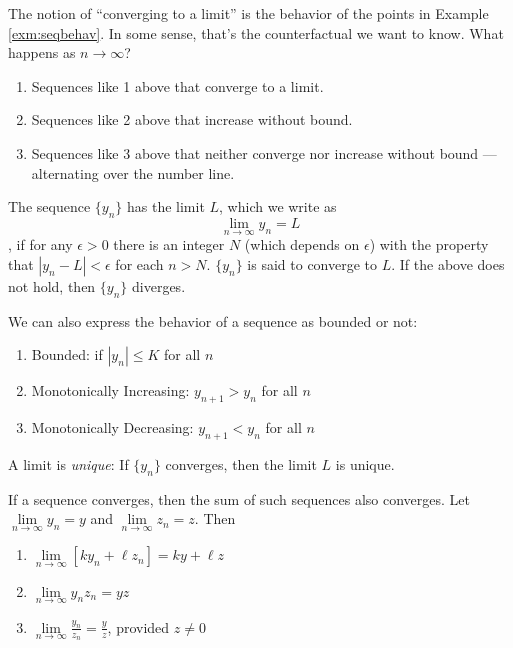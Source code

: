 \documentclass[]{book}
\providecommand{\tightlist}{%
  \setlength{\itemsep}{0pt}\setlength{\parskip}{0pt}}
\theoremstyle{definition}
\theoremstyle{definition}
\theoremstyle{definition}
\theoremstyle{remark}
\let\BeginKnitrBlock\begin \let\EndKnitrBlock\end
\begin{document}
The notion of ``converging to a limit'' is the behavior of the points in Example \ref{exm:seqbehav}. In some sense, that's the counterfactual we want to know. What happens as \(n\rightarrow \infty\)?

\begin{enumerate}
\def\labelenumi{\arabic{enumi}.}
\tightlist
\item
  Sequences like 1 above that converge to a limit.
\item
  Sequences like 2 above that increase without bound.
\item
  Sequences like 3 above that neither converge nor increase without bound --- alternating over the number line.
\end{enumerate}

\BeginKnitrBlock{definition}
\protect\hypertarget{def:unnamed-chunk-2}{}{\label{def:unnamed-chunk-2} }The sequence \(\{y_n\}\) has the limit \(L\), which we write as \[\lim\limits_{n \to \infty} y_n =L\], if for any \(\epsilon>0\) there is an integer \(N\) (which depends on \(\epsilon\)) with the property that \(|y_n -L|<\epsilon\) for each \(n>N\). \(\{y_n\}\) is said to converge to \(L\). If the above does not hold, then \(\{y_n\}\) diverges.
\EndKnitrBlock{definition}

We can also express the behavior of a sequence as bounded or not:

\begin{enumerate}
\def\labelenumi{\arabic{enumi}.}
\tightlist
\item
  Bounded: if \(|y_n|\le K\) for all \(n\)
\item
  Monotonically Increasing: \(y_{n+1}>y_n\) for all \(n\)
\item
  Monotonically Decreasing: \(y_{n+1}<y_n\) for all \(n\)
\end{enumerate}

A limit is \emph{unique}: If \(\{y_n\}\) converges, then the limit \(L\) is unique.

If a sequence converges, then the sum of such sequences also converges. Let \(\lim\limits_{n \to \infty} y_n = y\) and \(\lim\limits_{n \to \infty} z_n =z\). Then

\begin{enumerate}
\def\labelenumi{\arabic{enumi}.}
\tightlist
\item
  \(\lim\limits_{n \to \infty} [k y_n + \ell z_n]= k y + \ell z\)
\item
  \(\lim\limits_{n \to \infty} y_n z_n = yz\)
\item
  \(\lim\limits_{n \to \infty} \frac{y_n}{z_n} = \frac{y}{z}\), provided \(z\neq 0\)
\end{enumerate}
\end{document}

